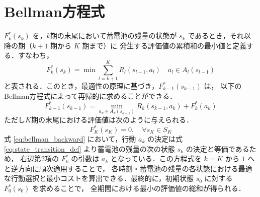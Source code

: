 \section{Bellman方程式}
	$F_{k}^{*}(s_k)$ を，$k$期の末尾において蓄電池の残量の状態が $s_k$ であるとき，それ以降の期（$k+1$ 期から $K$ 期まで）に
	発生する評価値の累積和の最小値と定義する．すなわち，
	\begin{equation}
		F_{k}^{*}(s_{k}) = \min \sum_{l=k+1}^{K} R_l(s_{l-1}, a_{l}) \quad a_l \in A_l(s_{l-1})
	\end{equation}
	と表される．このとき，最適性の原理に基づき，$F_{k-1}^{*}(s_{k-1})$ は，
	以下のBellman方程式によって再帰的に求めることができる．
	\begin{equation}
		F_{k-1}^{*}(s_{k-1}) = \min_{a_k \in A_k(s_{k-1})} { R_k(s_{k-1}, a_k) + F_{k}^{*}(a_k) }
		\label{eq:bellman_backward}
	\end{equation}
	ただし$K$期の末尾における評価値は次のように与えられる．
	\begin{equation}
		F_{K}^{*}(s_{K}) = 0,\quad \forall s_K \in S_K
	\end{equation}
	式 \eqref{eq:bellman_backward} において，行動 $a_k$ の決定は式 \eqref{eq:state_transition_def} より蓄電池の残量の次の状態 $s_k$ の決定と等価であるため，
	右辺第2項の $F_k^{*}$ の引数は $a_k$ となっている．この方程式を $k=K$ から $1$ へと逆方向に順次適用することで，
	各時刻・蓄電池の残量の各状態における最適な行動選択と最小コストを算出できる．最終的に，初期状態 $s_0$ に対する $F_0^*(s_0)$ を求めることで，
	全期間における最小の評価値の総和が得られる．

